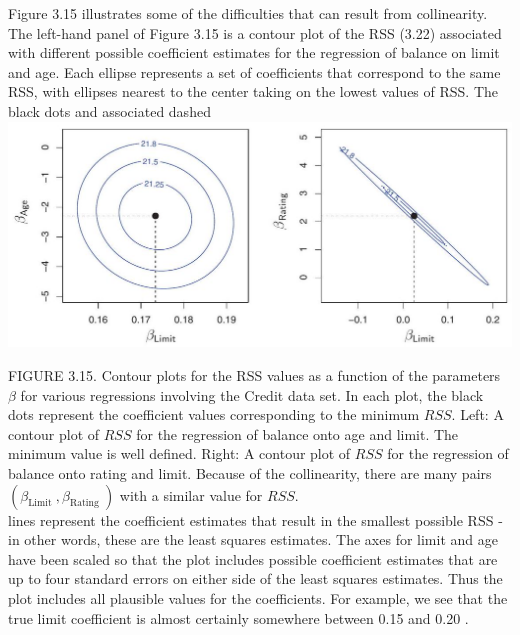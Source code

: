 \documentclass[10pt]{article}
\begin{document}
Figure 3.15 illustrates some of the difficulties that can result from collinearity. The left-hand panel of Figure 3.15 is a contour plot of the RSS (3.22) associated with different possible coefficient estimates for the regression of balance on limit and age. Each ellipse represents a set of coefficients that correspond to the same RSS, with ellipses nearest to the center taking on the lowest values of RSS. The black dots and associated dashed\\
\includegraphics[max width=\textwidth, center]{2025_05_05_efe77898333945044de4g-115}

FIGURE 3.15. Contour plots for the RSS values as a function of the parameters $\beta$ for various regressions involving the Credit data set. In each plot, the black dots represent the coefficient values corresponding to the minimum $R S S$. Left: A contour plot of $R S S$ for the regression of balance onto age and limit. The minimum value is well defined. Right: A contour plot of $R S S$ for the regression of balance onto rating and limit. Because of the collinearity, there are many pairs $\left(\beta_{\text {Limit }}, \beta_{\text {Rating }}\right)$ with a similar value for $R S S$.\\
lines represent the coefficient estimates that result in the smallest possible RSS - in other words, these are the least squares estimates. The axes for limit and age have been scaled so that the plot includes possible coefficient estimates that are up to four standard errors on either side of the least squares estimates. Thus the plot includes all plausible values for the coefficients. For example, we see that the true limit coefficient is almost certainly somewhere between 0.15 and 0.20 .
\end{document}

